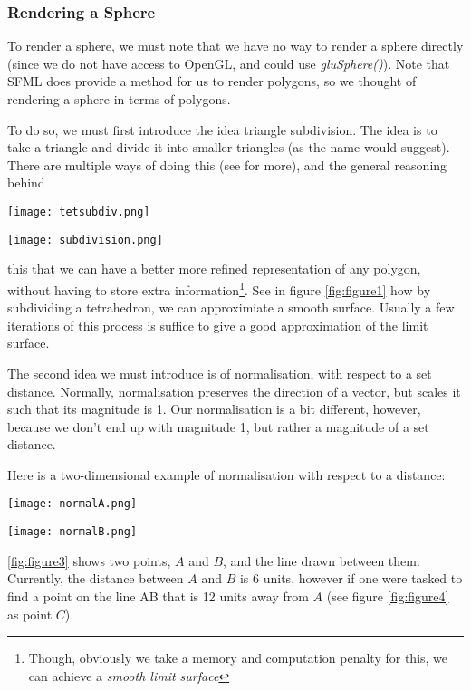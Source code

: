 \documentclass[main.tex]{subfiles}
\begin{document}
\subsubsection{Rendering a Sphere}
To render a sphere, we must note that we have no way to render a sphere directly (since we do not have access to OpenGL, and could use \textit{gluSphere()}). 
Note that SFML does provide a method for us to render polygons, so we thought of rendering a sphere in terms of polygons.

To do so, we must first introduce the idea triangle subdivision. The idea is to take a triangle and divide it into smaller triangles (as the name would suggest).
There are multiple ways of doing this (see \cite{Stam2010EvaluationOL} for more), and the general reasoning behind 
\begin{figure*} \texttt{[image: tetsubdiv.png]} \caption{Image shows the tetrahedron being subdivided 0, 1, 2, 6 times} \label{fig:figure1} \end{figure*}
\begin{figure*} \texttt{[image: subdivision.png]} \caption{shows the subdivison process on a equilateral triangle} \label{fig:figure2} \end{figure*}
this that we can have a better more refined representation of any polygon, without having to store extra information\footnote{Though, obviously we take
a memory and computation penalty for this, we can achieve a \textit{smooth limit surface}}. See in figure \ref{fig:figure1} how by subdividing a tetrahedron, 
we can approximiate a smooth surface. Usually a few iterations of this process is suffice to give a good approximation of the limit surface.

The second idea we must introduce is of normalisation, with respect to a set distance. Normally, normalisation preserves the direction of a vector, but scales it such that 
its magnitude is 1. Our normalisation is a bit different, however, because we don't end up with magnitude 1, but rather a magnitude of a set distance.

Here is a two-dimensional example of normalisation with respect to a distance:
\begin{figure*} \texttt{[image: normalA.png]} \caption{Image shows the tetrahedron being subdivided 0, 1, 2, 6 times} \label{fig:figure3} \end{figure*}
\begin{figure*} \texttt{[image: normalB.png]}\caption[width=0.5\columnwidth]{shows the point C, which is 12 units away from A}\label{fig:figure4}\end{figure*}
\ref{fig:figure3} shows two points, $A$ and $B$, and the line drawn between them. Currently, the distance between $A$ and $B$ is 6 units, however if one were tasked to find
a point on the line AB that is 12 units away from $A$ (see figure \ref{fig:figure4} as point $C$).
\end{document}
